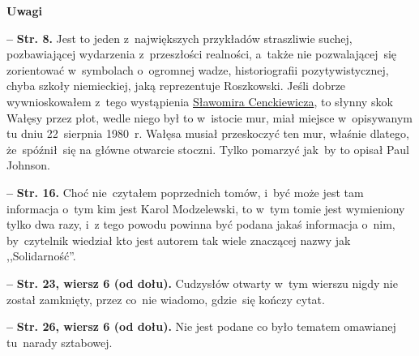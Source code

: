 \documentclass[a4paper,11pt]{article}
\newcommand{\spaceTwo}{2em}
\newcommand{\spaceFour}{0.5em}
\newcommand{\tb}{\textbf}
\newcommand{\noi}{\noindent}
\newcommand{\start}{\noi \tb{--} {}}
\newcommand{\Center}[1]{\begin{center} #1 \end{center}}
\newcommand{\CenterTB}[1]{\Center{\tb{#1}}}
\newcommand{\Str}[1]{\tb{Str. #1.}}
\newcommand{\StrWd}[2]{\tb{Str. #1, wiersz #2 (od dołu).}}
\begin{document}
\CenterTB{Uwagi}

\start \Str{8} Jest to jeden z~największych przykładów straszliwie
suchej, pozbawiającej wydarzenia z~przeszłości realności, a~także nie
pozwalającej~się zorientować w~symbolach o~ogromnej wadze,
historiografii pozytywistycznej, chyba szkoły niemieckiej, jaką
reprezentuje Roszkowski. Jeśli dobrze wywnioskowałem z~tego
wystąpienia
\href{https://www.youtube.com/watch?v=6B93_3CCMac}{Sławomira
  Cenckiewicza}, to słynny skok Wałęsy przez płot, wedle niego był to
w~istocie mur, miał miejsce w~opisywanym tu dniu 22~sierpnia 1980~r.
Wałęsa musiał przeskoczyć ten mur, właśnie dlatego, że~spóźnił~się na
główne otwarcie stoczni. Tylko pomarzyć jak~by to opisał Paul Johnson.

\vspace{\spaceFour}


\start \Str{16} Choć nie~czytałem poprzednich tomów, i~być może jest
tam informacja o~tym kim jest Karol Modzelewski, to w~tym tomie jest
wymieniony tylko dwa razy, i~z tego powodu powinna być podana jakaś
informacja o~nim, by~czytelnik wiedział kto jest autorem tak wiele
znaczącej nazwy jak ,,Solidarność''.

\vspace{\spaceFour}


\start \StrWd{23}{6} Cudzysłów otwarty w~tym wierszu nigdy nie został
zamknięty, przez co~nie wiadomo, gdzie~się kończy cytat.

\vspace{\spaceFour}


\start \StrWd{26}{6} Nie jest podane co było tematem omawianej
tu~narady sztabowej.



\vspace{\spaceTwo}
\end{document}

